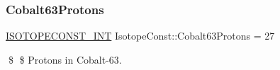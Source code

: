 \subsubsection{\texorpdfstring{Cobalt63\+Protons}{Cobalt63Protons}}
{\footnotesize\ttfamily \mbox{\hyperlink{group___isotope_const-_macros_ga5f18360b3e99483a35c32d789e62621c}{I\+S\+O\+T\+O\+P\+E\+C\+O\+N\+S\+T\+\_\+\+I\+NT}} Isotope\+Const\+::\+Cobalt63\+Protons = 27}

\$ \$ Protons in Cobalt-\/63. 